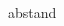 \documentclass[conference, 11pt]{IEEEtran}
\begin{document}
\begin{thebibliography}{00}













abstand\\


 


\end{thebibliography}
\end{document}
